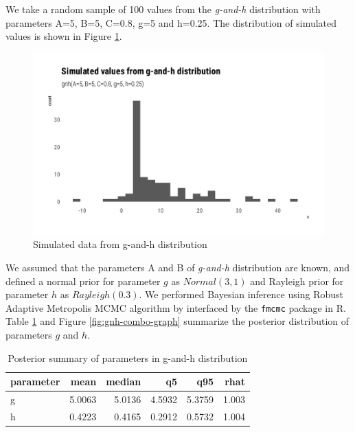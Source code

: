\documentclass[ba]{imsart}
\numberwithin{equation}{section}
\theoremstyle{plain}
\begin{document}
We take a random sample of 100 values from the \emph{g-and-h} distribution with parameters A=5, B=5, C=0.8, g=5 and h=0.25. The distribution of simulated values is shown in Figure \ref{fig:gnh-data}.

\begin{figure}

{\centering \includegraphics[width=0.8\linewidth]{BA-submission_files/figure-latex/gnh-data-1} 

}

\caption{Simulated data from g-and-h distribution}\label{fig:gnh-data}
\end{figure}

We assumed that the parameters A and B of \emph{g-and-h} distribution are known, and defined a normal prior for parameter \(g\) as \(Normal(3,1)\) and Rayleigh prior for parameter \(h\) as \(Rayleigh(0.3)\). We performed Bayesian inference using Robust Adaptive Metropolis MCMC algorithm by \citet{vihola2012RobustAdaptiveMetropolis} interfaced by the \texttt{fmcmc} package \citep{vegayon2019FmcmcFriendlyMCMC} in R. Table \ref{tab:gnh-fit-tbl} and Figure \ref{fig:gnh-combo-graph} summarize the posterior distribution of parameters \(g\) and \(h\).

\begin{table}[!h]

\caption{\label{tab:gnh-fit-tbl}Posterior summary of parameters in g-and-h distribution}
\centering
\begin{tabular}[t]{lrrrrr}
\toprule
parameter & mean & median & q5 & q95 & rhat\\
\midrule
g & 5.0063 & 5.0136 & 4.5932 & 5.3759 & 1.003\\
h & 0.4223 & 0.4165 & 0.2912 & 0.5732 & 1.004\\
\bottomrule
\end{tabular}
\end{table}
\end{document}
